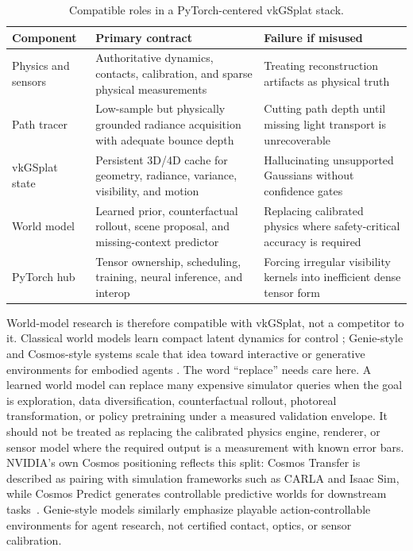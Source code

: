 \documentclass[10pt,journal,onecolumn]{IEEEtran}
\begin{document}
\begin{table}[t]
\centering
\footnotesize
\caption{Compatible roles in a PyTorch-centered vkGSplat stack.}
\label{tab:pytorch-world-roles}
\begin{tabular}{p{}p{}p{}}
\toprule
Component & Primary contract & Failure if misused \\
\midrule
Physics and sensors & Authoritative dynamics, contacts, calibration, and sparse physical measurements & Treating reconstruction artifacts as physical truth \\
Path tracer & Low-sample but physically grounded radiance acquisition with adequate bounce depth & Cutting path depth until missing light transport is unrecoverable \\
vkGSplat state & Persistent 3D/4D cache for geometry, radiance, variance, visibility, and motion & Hallucinating unsupported Gaussians without confidence gates \\
World model & Learned prior, counterfactual rollout, scene proposal, and missing-context predictor & Replacing calibrated physics where safety-critical accuracy is required \\
PyTorch hub & Tensor ownership, scheduling, training, neural inference, and interop & Forcing irregular visibility kernels into inefficient dense tensor form \\
\bottomrule
\end{tabular}
\end{table}

World-model research is therefore compatible with vkGSplat, not a competitor
to it. Classical world models learn compact latent dynamics for control
\cite{ha2018}; Genie-style and Cosmos-style systems scale that idea toward
interactive or generative environments for embodied agents
\cite{bruce2024,deepmind2024genie2,nvidia2024cosmos}. The word ``replace''
needs care here. A learned world model can replace many expensive simulator
queries when the goal is exploration, data diversification, counterfactual
rollout, photoreal transformation, or policy pretraining under a measured
validation envelope. It should not be treated as replacing the calibrated
physics engine, renderer, or sensor model where the required output is a
measurement with known error bars. NVIDIA's own Cosmos positioning reflects
this split: Cosmos Transfer is described as pairing with simulation frameworks
such as CARLA and Isaac Sim, while Cosmos Predict generates controllable
predictive worlds for downstream tasks~\cite{nvidia2024cosmos}. Genie-style
models similarly emphasize playable action-controllable environments for agent
research, not certified contact, optics, or sensor calibration.
\end{document}
